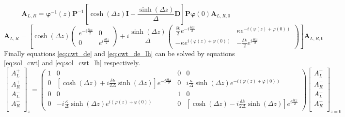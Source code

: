 \begin{equation}
	\bm{A}_{L,R} = \bm{\varphi}^{-1}(z) \bm{P}^{-1} \left[\cosh(\Delta z)\bm{I} + \frac{\sinh(\Delta z)}{\Delta}\bm{D}\right]\bm{P}\bm{\varphi}(0)\bm{A}_{L,R,0}
\end{equation}
\begin{equation}
	\bm{A}_{L,R} = \left[\cosh(\Delta z)\begin{pmatrix}
	e^{-i\frac{\delta kz}{2} } & 0 \\
	0 & e^{i\frac{\delta kz}{2}}
	\end{pmatrix} + i\frac{\sinh(\Delta z)}{\Delta}\begin{pmatrix}
	\frac{\delta k}{2} e^{-i\frac{\delta kz}{2}} & \kappa e^{-i(\varphi(z)+\varphi(0))}\\
	-\kappa e^{i(\varphi(z)+\varphi(0))} & - \frac{\delta k}{2} e^{i\frac{\delta kz}{2}}
	\end{pmatrix}\right]\bm{A}_{L,R,0}
\end{equation}
Finally equations \ref{eq:cwt_de} and \ref{eq:cwt_de_lh} can be solved by equations \ref{eq:sol_cwt} and \ref{eq:sol_cwt_lh} respectively.
\begin{equation}
	\begin{bmatrix}
	A_L^+ \\
	A_R^+ \\
	A_L^- \\
	A_R^- \\
	\end{bmatrix}_{z} = \begin{pmatrix}
	1 & 0 & 0 & 0 \\
	0 & \left[\cosh(\Delta z) + i \frac{\delta k}{2\Delta}\sinh(\Delta z)\right] e^{-i\frac{\delta kz}{2} }& 0 & i\frac{\kappa}{\Delta}\sinh(\Delta z) e^{-i(\varphi(z)+\varphi(0))} \\
	0 & 0 & 1 & 0 \\
	0 & -i \frac{\kappa}{\Delta}\sinh(\Delta z)e^{i(\varphi(z)+\varphi(0))} & 0 & \left[\cosh(\Delta z) - i \frac{\delta k 	}{2\Delta}\sinh(\Delta z)\right]e^{i\frac{\delta kz}{2} }
	\end{pmatrix}\begin{bmatrix}
	A_L^+ \\
	A_R^+ \\
	A_L^- \\
	A_R^- \\
	\end{bmatrix}_{z=0}	\label{eq:sol_cwt}
\end{equation}
